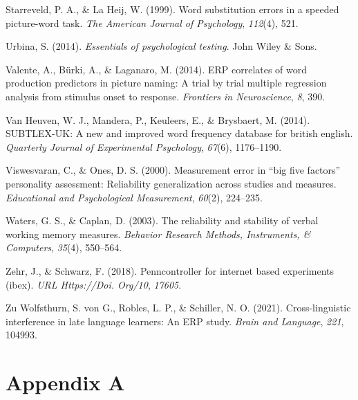 \documentclass[
  man,floatsintext]{apa6}
\newlength{\cslhangindent}
\newlength{\cslentryspacingunit} %
\newenvironment{CSLReferences}[2] %
 {%
  \setlength{\parindent}{0pt}
  \ifodd #1
  \let\oldpar\par
  \def\par{\hangindent=\cslhangindent\oldpar}
  \fi
  \setlength{\parskip}{#2\cslentryspacingunit}
 }%
 {}
\begin{document}
\begin{CSLReferences}{1}{0}
\leavevmode{}%
Starreveld, P. A., \& La Heij, W. (1999). Word substitution errors in a speeded picture-word task. \emph{The American Journal of Psychology}, \emph{112}(4), 521.

\leavevmode{}%
Urbina, S. (2014). \emph{Essentials of psychological testing}. John Wiley \& Sons.

\leavevmode{}%
Valente, A., Bürki, A., \& Laganaro, M. (2014). ERP correlates of word production predictors in picture naming: A trial by trial multiple regression analysis from stimulus onset to response. \emph{Frontiers in Neuroscience}, \emph{8}, 390.

\leavevmode{}%
Van Heuven, W. J., Mandera, P., Keuleers, E., \& Brysbaert, M. (2014). SUBTLEX-UK: A new and improved word frequency database for british english. \emph{Quarterly Journal of Experimental Psychology}, \emph{67}(6), 1176--1190.

\leavevmode{}%
Viswesvaran, C., \& Ones, D. S. (2000). Measurement error in {``big five factors''} personality assessment: Reliability generalization across studies and measures. \emph{Educational and Psychological Measurement}, \emph{60}(2), 224--235.

\leavevmode{}%
Waters, G. S., \& Caplan, D. (2003). The reliability and stability of verbal working memory measures. \emph{Behavior Research Methods, Instruments, \& Computers}, \emph{35}(4), 550--564.

\leavevmode{}%
Zehr, J., \& Schwarz, F. (2018). Penncontroller for internet based experiments (ibex). \emph{URL Https://Doi. Org/10}, \emph{17605}.

\leavevmode{}%
Zu Wolfsthurn, S. von G., Robles, L. P., \& Schiller, N. O. (2021). Cross-linguistic interference in late language learners: An ERP study. \emph{Brain and Language}, \emph{221}, 104993.

\end{CSLReferences}

\endgroup

\newpage

\hypertarget{appendix-a}{%
\section{Appendix A}\label{appendix-a}}
\end{document}
